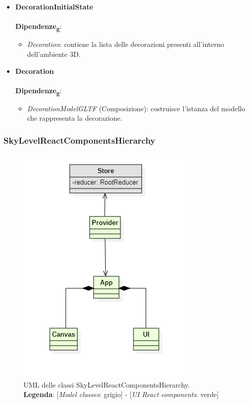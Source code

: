 \begin{itemize}
		\item \textbf{DecorationInitialState}
		\\\\
		\textbf{Dipendenze\textsubscript{g}}:
		\begin{itemize}
			\item \textit{Decoration}: contiene la lista delle decorazioni presenti all'interno dell'ambiente 3D.
		\end{itemize}

		\item \textbf{Decoration}
		\\\\
		\textbf{Dipendenze\textsubscript{g}}:
		\begin{itemize}
			\item \textit{DecorationModelGLTF} (Composizione): costruisce l'istanza del modello che rappresenta la decorazione.
		\end{itemize}
\end{itemize}

\subsubsection{SkyLevelReactComponentsHierarchy}
\begin{figure}[H]
	\centering
	\includegraphics[scale=0.75, keepaspectratio]{./res/images/skyLevelReactComponentHierarchy.PNG}
	\caption[UML delle classi SkyLevelReactComponentsHierarchy]{
	UML delle classi SkyLevelReactComponentsHierarchy.
	\\
	\textbf{Legenda}: 
	[\textit{Model classes}: grigio] -
	[\textit{UI React components}: verde]}
\end{figure}

